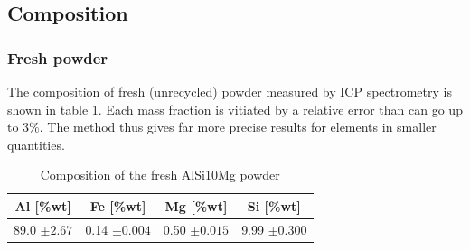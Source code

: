  \begin{center}
\begin{table}[ht]
\noindent{}

\caption[Average powder diameter and standard deviation before and after ultrasonic treatment]{Average powder diameter and standard deviation before and after ultrasonic treatment}
\label{tab:BAUS}
\end{table}
 \end{center}

\subsection{Composition}

\subsubsection{Fresh powder}

The composition of fresh (unrecycled) powder measured by ICP spectrometry is shown in table \ref{tab:compoF}. Each mass fraction is vitiated by a relative error than can go up to 3\%. The method thus gives far more precise results for elements in smaller quantities.\\
 \begin{center}
\begin{table}[ht]
\centering
\begin{tabular}{|c|c |c |c| }
    \hline
    Al [\%wt]& Fe [\%wt]&Mg [\%wt]&Si [\%wt]\\
\hline 
\hline   
    89.0 $\pm 2.67$&0.14 $\pm 0.004$& 0.50 $\pm 0.015$ &9.99 $\pm 0.300$\\
    \hline
\end{tabular}

\caption[Composition of the fresh AlSi10Mg powder]{Composition of the fresh AlSi10Mg powder}
\label{tab:compoF}
\end{table}
 \end{center}


